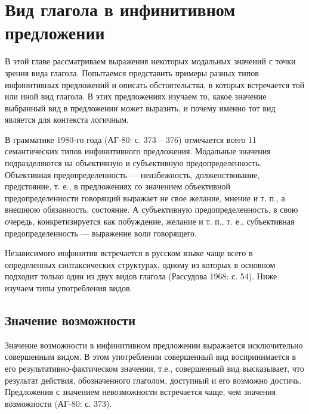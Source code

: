\section{Вид глагола в инфинитивном предложении}

В этой главе рассматриваем выражения некоторых модальных значений с точки зрения вида глагола. Попытаемся представить примеры разных типов инфинитивных предложений и описать обстоятельства, в которых встречается той или иной вид глагола. В этих предложениях изучаем то, какое значение выбранный вид в предложении может выразить, и почему именно тот вид является для контекста логичным. 


В грамматике 1980-го года (АГ-80: с. 373 -- 376) отмечается всего 11 семантических типов инфинитивного предложения. Модальные значения подразделяются на объективную и субъективную предопределенность. Объективная предопределенность --- неизбежность, долженствование, предстояние, т. е., в предложениях со значением объективной предопределенности говорящий выражает не свое желание, мнение и т. п., а внешнюю обязанность, состояние. А субъективную предопределенность, в свою очередь, конкретизируется как побуждение, желание и т. п., т. е., субъективная предопределенность --- выражение воли говорящего.

Независимого инфинитив встречается в русском языке чаще всего в определенных синтаксических структурах, одному из которых в основном подходит только один из двух видов глагола (Рассудова 1968: с. 54). Ниже изучаем типы употребления видов.

\subsection{Значение возможности}

Значение возможности в инфинитивном предложении выражается исключительно совершенным видом. В этом употреблении совершенный вид воспринимается в его результативно-фактическом значении, т.е., совершенный вид высказывает, что результат действия, обозначенного глаголом, доступный и его возможно достичь. Предложения с значением невозможности встречается чаще, чем значения возможности (АГ-80: с. 373). 

